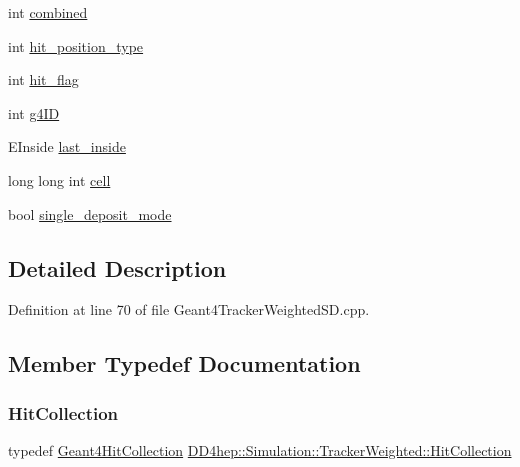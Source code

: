 \begin{DoxyCompactItemize}
\item 
int \hyperlink{struct_d_d4hep_1_1_simulation_1_1_tracker_weighted_a7059ba8b2d85cb67220b0184f038f9f9}{combined}
\item 
int \hyperlink{struct_d_d4hep_1_1_simulation_1_1_tracker_weighted_a5120f0b661148efb35b7432c8c58c7ce}{hit\+\_\+position\+\_\+type}
\item 
int \hyperlink{struct_d_d4hep_1_1_simulation_1_1_tracker_weighted_a9ffa7f998b3a1f16864ecbb894ca2e54}{hit\+\_\+flag}
\item 
int \hyperlink{struct_d_d4hep_1_1_simulation_1_1_tracker_weighted_a1205a645db026a115eb182e439929818}{g4\+ID}
\item 
E\+Inside \hyperlink{struct_d_d4hep_1_1_simulation_1_1_tracker_weighted_afc2a6289bb11f08b03d50e0b8e271083}{last\+\_\+inside}
\item 
long long int \hyperlink{struct_d_d4hep_1_1_simulation_1_1_tracker_weighted_aeced4bab28aa79ad7bab14ca9ce02c79}{cell}
\item 
bool \hyperlink{struct_d_d4hep_1_1_simulation_1_1_tracker_weighted_aca48801717dfd735529eb3fda99e999a}{single\+\_\+deposit\+\_\+mode}
\end{DoxyCompactItemize}


\subsection{Detailed Description}


Definition at line 70 of file Geant4\+Tracker\+Weighted\+S\+D.\+cpp.



\subsection{Member Typedef Documentation}
\hypertarget{struct_d_d4hep_1_1_simulation_1_1_tracker_weighted_a99a4be34af7901b0aab7398894ba906a}{}\label{struct_d_d4hep_1_1_simulation_1_1_tracker_weighted_a99a4be34af7901b0aab7398894ba906a} 
\subsubsection{\texorpdfstring{Hit\+Collection}{HitCollection}}
{\footnotesize\ttfamily typedef \hyperlink{class_d_d4hep_1_1_simulation_1_1_geant4_hit_collection}{Geant4\+Hit\+Collection} \hyperlink{struct_d_d4hep_1_1_simulation_1_1_tracker_weighted_a99a4be34af7901b0aab7398894ba906a}{D\+D4hep\+::\+Simulation\+::\+Tracker\+Weighted\+::\+Hit\+Collection}}



